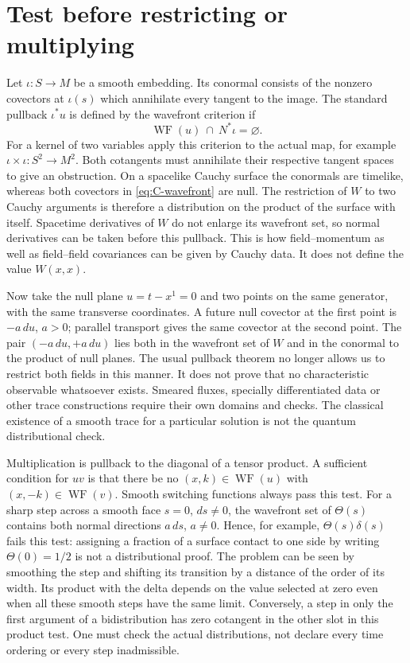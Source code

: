\section{Test before restricting or multiplying}
Let $\iota:S\to M$ be a smooth embedding. Its conormal consists of the
nonzero covectors at $\iota(s)$ which annihilate every tangent to the
image. The standard pullback $\iota^*u$ is defined by the wavefront
criterion if
\[
 \operatorname{WF}(u)\ \cap\ N^*\iota=\varnothing .
\]
For a kernel of two variables apply this criterion to the actual map, for
example $\iota\times\iota:S^2\to M^2$. Both cotangents must annihilate
their respective tangent spaces to give an obstruction. On a spacelike
Cauchy surface the conormals are timelike, whereas both covectors in
\eqref{eq:C-wavefront} are null. The restriction of $W$ to two Cauchy
arguments is therefore a distribution on the product of the surface with
itself. Spacetime derivatives of $W$ do not enlarge its wavefront set, so
normal derivatives can be taken before this pullback. This is how
field--momentum as well as field--field covariances can be given by Cauchy
data. It does not define the value $W(x,x)$.

Now take the null plane $u=t-x^1=0$ and two points on the same generator,
with the same transverse coordinates. A future null covector at the first
point is $-a\,du$, $a>0$; parallel transport gives the same covector at
the second point. The pair $(-a\,du,+a\,du)$ lies both in the wavefront
set of $W$ and in the conormal to the product of null planes. The usual
pullback theorem no longer allows us to restrict both fields in this
manner. It does not prove that no characteristic observable whatsoever
exists. Smeared fluxes, specially differentiated data or other trace
constructions require their own domains and checks. The classical
existence of a smooth trace for a particular solution is not the quantum
distributional check.

Multiplication is pullback to the diagonal of a tensor product. A
sufficient condition for $uv$ is that there be no $(x,k)\in
\operatorname{WF}(u)$ with $(x,-k)\in\operatorname{WF}(v)$. Smooth
switching functions always pass this test. For a sharp step across a smooth
face $s=0$, $ds\ne0$, the wavefront set of $\Theta(s)$ contains both
normal directions $a\,ds$, $a\ne0$. Hence, for example,
$\Theta(s)\delta(s)$ fails this test: assigning a fraction of a surface
contact to one side by writing $\Theta(0)=1/2$ is not a distributional
proof. The problem can be seen by smoothing the step and shifting its
transition by a distance of the order of its width. Its product with the
delta depends on the value selected at zero even when all these smooth
steps have the same limit. Conversely, a step in only the first argument
of a bidistribution has zero cotangent in the other slot in this product
test. One must check the actual distributions, not declare every time
ordering or every step inadmissible.

